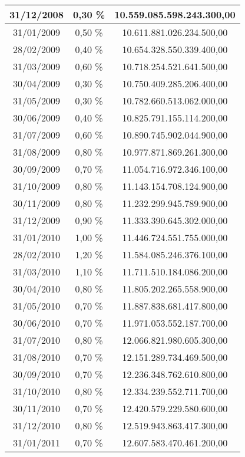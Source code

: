 \begin{center}
\begin{longtable}{|c|c|c|}
31/12/2008 & 0,30 \% & 10.559.085.598.243.300,00  \\ \hline
31/01/2009 & 0,50 \% & 10.611.881.026.234.500,00  \\ \hline
28/02/2009 & 0,40 \% & 10.654.328.550.339.400,00  \\ \hline
31/03/2009 & 0,60 \% & 10.718.254.521.641.500,00  \\ \hline
30/04/2009 & 0,30 \% & 10.750.409.285.206.400,00  \\ \hline
31/05/2009 & 0,30 \% & 10.782.660.513.062.000,00  \\ \hline
30/06/2009 & 0,40 \% & 10.825.791.155.114.200,00  \\ \hline
31/07/2009 & 0,60 \% & 10.890.745.902.044.900,00  \\ \hline
31/08/2009 & 0,80 \% & 10.977.871.869.261.300,00  \\ \hline
30/09/2009 & 0,70 \% & 11.054.716.972.346.100,00  \\ \hline
31/10/2009 & 0,80 \% & 11.143.154.708.124.900,00  \\ \hline
30/11/2009 & 0,80 \% & 11.232.299.945.789.900,00  \\ \hline
31/12/2009 & 0,90 \% & 11.333.390.645.302.000,00  \\ \hline
31/01/2010 & 1,00 \% & 11.446.724.551.755.000,00  \\ \hline
28/02/2010 & 1,20 \% & 11.584.085.246.376.100,00  \\ \hline
31/03/2010 & 1,10 \% & 11.711.510.184.086.200,00  \\ \hline
30/04/2010 & 0,80 \% & 11.805.202.265.558.900,00  \\ \hline
31/05/2010 & 0,70 \% & 11.887.838.681.417.800,00  \\ \hline
30/06/2010 & 0,70 \% & 11.971.053.552.187.700,00  \\ \hline
31/07/2010 & 0,80 \% & 12.066.821.980.605.300,00  \\ \hline
31/08/2010 & 0,70 \% & 12.151.289.734.469.500,00  \\ \hline
30/09/2010 & 0,70 \% & 12.236.348.762.610.800,00  \\ \hline
31/10/2010 & 0,80 \% & 12.334.239.552.711.700,00  \\ \hline
30/11/2010 & 0,70 \% & 12.420.579.229.580.600,00  \\ \hline
31/12/2010 & 0,80 \% & 12.519.943.863.417.300,00  \\ \hline
31/01/2011 & 0,70 \% & 12.607.583.470.461.200,00  \\ \hline

\end{longtable}
\end{center}
